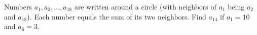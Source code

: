 Numbers $a_{1}, a_{2}, \ldots, a_{18}$ are written around a circle (with neighbors of $a_{1}$ being $a_{2}$ and $a_{18}$). Each number equals the sum of its two neighbors. Find $a_{14}$ if $a_{1}=10$ and $a_{6}=3$.
